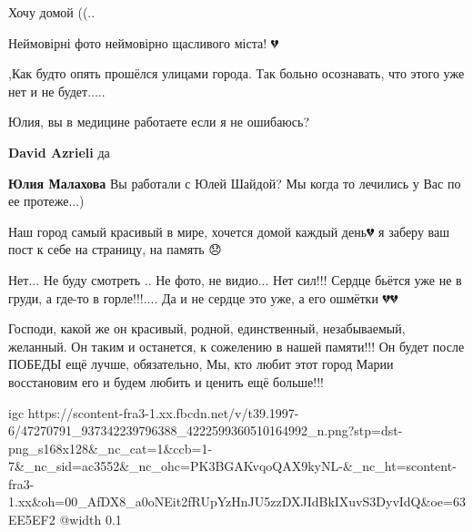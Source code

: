 
 
 
 
 

\qqSecCmt


Хочу домой ((..


Неймовірні фото неймовірно щасливого міста! 💔


,Как будто опять прошёлся улицами города. Так больно осознавать, что этого уже нет и не будет.....


Юлия, вы в медицине работаете если я не ошибаюсь?

\begin{itemize} %
\textbf{David Azrieli} да

\textbf{Юлия Малахова} Вы работали с Юлей Шайдой? Мы когда то лечились у Вас по ее протеже...)
\end{itemize} %


Наш город самый красивый в мире, хочется домой каждый день💔 я заберу ваш пост
к себе на страницу, на память 😞


Нет... Не буду смотреть .. Не фото, не видио... Нет сил!!! Сердце бьётся уже не
в груди, а где-то в горле!!!.... Да и не сердце это уже, а его ошмётки 💔💔


Господи, какой же он красивый, родной, единственный, незабываемый, желанный. Он
таким и останется, к сожелению в нашей памяти!!! Он будет после ПОБЕДЫ ещё
лучше, обязательно, Мы, кто любит этот город Марии восстановим его и будем любить
и ценить ещё больше!!!

\ifcmt
  igc https://scontent-fra3-1.xx.fbcdn.net/v/t39.1997-6/47270791_937342239796388_4222599360510164992_n.png?stp=dst-png_s168x128&_nc_cat=1&ccb=1-7&_nc_sid=ac3552&_nc_ohc=PK3BGAKvqoQAX9kyNL-&_nc_ht=scontent-fra3-1.xx&oh=00_AfDX8_a0oNEit2fRUpYzHnJU5zzDXJIdBkIXuvS3DyvIdQ&oe=63EE5EF2
	@width 0.1
\fi


